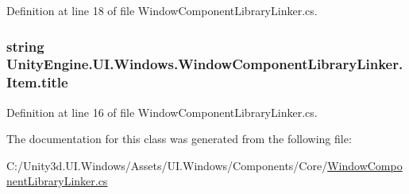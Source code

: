 Definition at line 18 of file Window\+Component\+Library\+Linker.\+cs.

\hypertarget{class_unity_engine_1_1_u_i_1_1_windows_1_1_window_component_library_linker_1_1_item_afddff68f29a67d599b3a3f7da240ce48}{}
\subsubsection[{title}]{\setlength{\rightskip}{0pt plus 5cm}string Unity\+Engine.\+U\+I.\+Windows.\+Window\+Component\+Library\+Linker.\+Item.\+title}\label{class_unity_engine_1_1_u_i_1_1_windows_1_1_window_component_library_linker_1_1_item_afddff68f29a67d599b3a3f7da240ce48}


Definition at line 16 of file Window\+Component\+Library\+Linker.\+cs.



The documentation for this class was generated from the following file\+:\begin{DoxyCompactItemize}
\item 
C\+:/\+Unity3d.\+U\+I.\+Windows/\+Assets/\+U\+I.\+Windows/\+Components/\+Core/\hyperlink{_window_component_library_linker_8cs}{Window\+Component\+Library\+Linker.\+cs}\end{DoxyCompactItemize}
